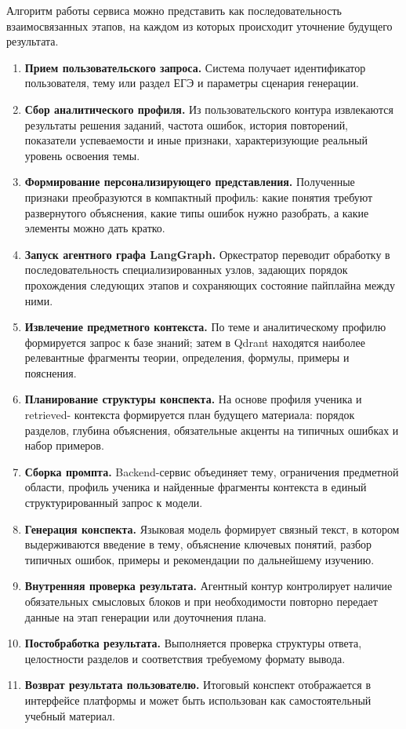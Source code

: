 \documentclass[a4paper,12pt]{extarticle}
\begin{document}
Алгоритм работы сервиса можно представить как последовательность взаимосвязанных этапов, 
на каждом из которых происходит уточнение будущего результата.

\begin{enumerate}
    \item \textbf{Прием пользовательского запроса.} Система получает идентификатор 
	пользователя, тему или раздел ЕГЭ и параметры сценария генерации.
    \item \textbf{Сбор аналитического профиля.} Из пользовательского контура извлекаются 
	результаты решения заданий, частота ошибок, история повторений, 
	показатели успеваемости и иные признаки, характеризующие реальный уровень освоения темы.
    \item \textbf{Формирование персонализирующего представления.} Полученные признаки 
	преобразуются в компактный профиль: какие понятия требуют развернутого объяснения, 
	какие типы ошибок нужно разобрать, а какие элементы можно дать кратко.
    \item \textbf{Запуск агентного графа LangGraph.} Оркестратор переводит обработку в
	последовательность специализированных узлов, задающих порядок прохождения следующих этапов
	и сохраняющих состояние пайплайна между ними.
    \item \textbf{Извлечение предметного контекста.} По теме и аналитическому профилю 
	формируется запрос к базе знаний; затем в Qdrant находятся наиболее релевантные 
	фрагменты теории, определения, формулы, примеры и пояснения.
    \item \textbf{Планирование структуры конспекта.} На основе профиля ученика и retrieved-
	контекста формируется план будущего материала: порядок разделов, глубина объяснения,
	обязательные акценты на типичных ошибках и набор примеров.
    \item \textbf{Сборка промпта.} Backend-сервис объединяет тему, ограничения предметной 
	области, профиль ученика и найденные фрагменты контекста в единый структурированный 
	запрос к модели.
    \item \textbf{Генерация конспекта.} Языковая модель формирует связный текст, в котором 
	выдерживаются введение в тему, объяснение ключевых понятий, разбор типичных ошибок, 
	примеры и рекомендации по дальнейшему изучению.
    \item \textbf{Внутренняя проверка результата.} Агентный контур контролирует наличие
	обязательных смысловых блоков и при необходимости повторно передает данные на этап
	генерации или доуточнения плана.
    \item \textbf{Постобработка результата.} Выполняется проверка структуры ответа, 
	целостности разделов и соответствия требуемому формату вывода.
    \item \textbf{Возврат результата пользователю.} Итоговый конспект отображается в 
	интерфейсе платформы и может быть использован как самостоятельный учебный материал.
\end{enumerate}
\end{document}
